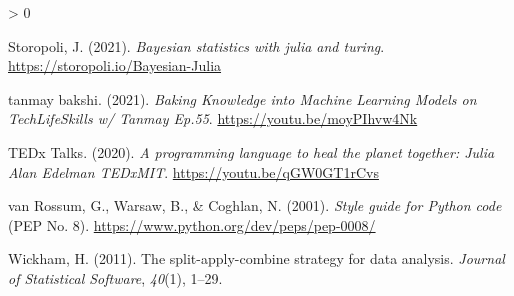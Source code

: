 \documentclass[
  notoc %
]{tufte-book}
\newlength{\cslhangindent}
\newenvironment{CSLReferences}[2] %
 {%
  \setlength{\parindent}{0pt}
  \ifodd #1 \everypar{\setlength{\hangindent}{\cslhangindent}}\ignorespaces\fi
  \ifnum #2 > 0
  \setlength{\parskip}{#2\baselineskip}
  \fi
 }%
 {}
\begin{document}
\begin{CSLReferences}{1}{0}
\leavevmode{}%
Storopoli, J. (2021). \emph{Bayesian statistics with julia and turing}.
\url{https://storopoli.io/Bayesian-Julia}

\leavevmode{}%
tanmay bakshi. (2021). \emph{Baking {Knowledge} into {Machine Learning
Models} on {TechLifeSkills} w/ {Tanmay
Ep}.55}. \url{https://youtu.be/moyPIhvw4Nk}

\leavevmode{}%
TEDx Talks. (2020). \emph{A programming language to heal the planet
together: {Julia} \textbar{} {Alan Edelman} \textbar{} {TEDxMIT}}.
\url{https://youtu.be/qGW0GT1rCvs}

\leavevmode{}%
van Rossum, G., Warsaw, B., \& Coghlan, N. (2001). \emph{Style guide for
{Python} code} (PEP No. 8).
\url{https://www.python.org/dev/peps/pep-0008/}

\leavevmode{}%
Wickham, H. (2011). The split-apply-combine strategy for data analysis.
\emph{Journal of Statistical Software}, \emph{40}(1), 1--29.

\end{CSLReferences}

\backmatter
\end{document}
